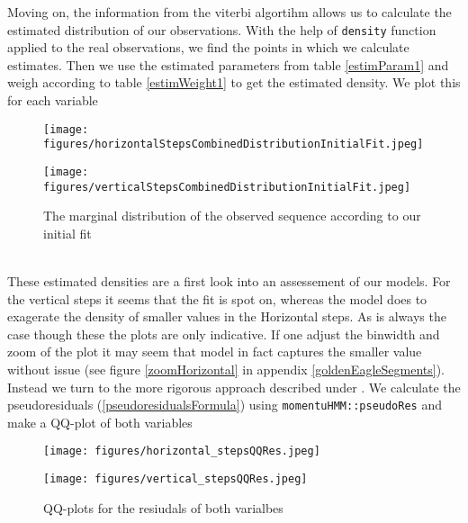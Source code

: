 Moving on, the information from the viterbi algortihm allows us to calculate the estimated distribution of our observations. With the help of \texttt{density} function \cite{RLang} applied to the real observations, we find the points in which we calculate estimates. Then we use the estimated parameters from table \ref{estimParam1} and weigh according to table \ref{estimWeight1} to get the estimated density. We plot this for each variable
\begin{figure}[h]
    \centering
    \begin{minipage}[b]{0.49\textwidth}
      \texttt{[image: figures/horizontalStepsCombinedDistributionInitialFit.jpeg]}
    \end{minipage}
    \hfill
    \begin{minipage}[b]{0.49\textwidth}
      \texttt{[image: figures/verticalStepsCombinedDistributionInitialFit.jpeg]}
    \end{minipage}
    \caption{The marginal distribution of the observed sequence according to our initial fit}
    \label{combinedDensityPlotsInitialFit}
\end{figure}\\
These estimated densities are a first look into an assessement of our models. For the vertical steps it seems that the fit is spot on, whereas the model does to exagerate the density of smaller values in the Horizontal steps. As is always the case though these the plots are only indicative. If one adjust the binwidth and zoom of the plot it may seem that model in fact captures the smaller value without issue (see figure \ref{zoomHorizontal} in appendix \ref{goldenEagleSegments}). Instead we turn to the more rigorous approach described under . We calculate the pseudoresiduals (\ref{pseudoresidualsFormula}) using \texttt{momentuHMM::pseudoRes} and make a QQ-plot of both variables
\begin{figure}[h]
    \centering
    \begin{minipage}[b]{0.49\textwidth}
      \texttt{[image: figures/horizontal\_stepsQQRes.jpeg]}
    \end{minipage}
    \hfill
    \begin{minipage}[b]{0.49\textwidth}
      \texttt{[image: figures/vertical\_stepsQQRes.jpeg]}
    \end{minipage}
    \caption{QQ-plots for the resiudals of both varialbes}
    \label{combinedQQPlots}
\end{figure}\\
